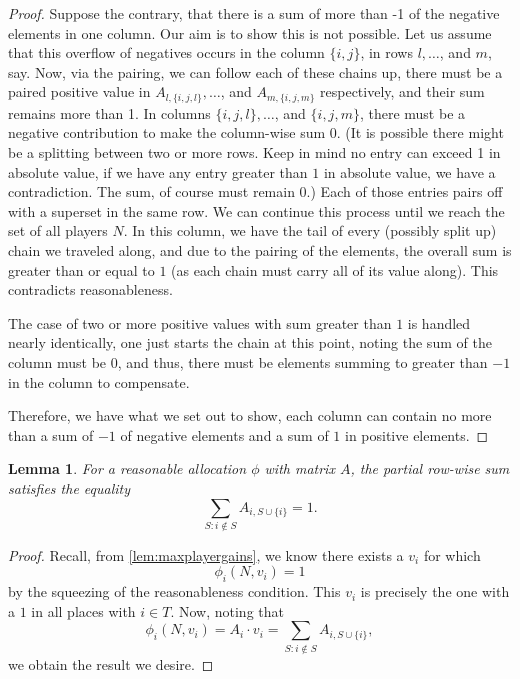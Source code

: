 \documentclass[12pt,letterpaper,final]{article}
\theoremstyle{plain}
\theoremstyle{plain}
\theoremstyle{plain}
\newtheorem{lemma}[theorem]{Lemma}
\theoremstyle{plain}
\theoremstyle{plain}
\theoremstyle{plain}
\theoremstyle{plain}
\theoremstyle{definition}
\theoremstyle{definition}
\theoremstyle{definition}
\theoremstyle{definition}
\theoremstyle{definition}
\theoremstyle{remark}
\theoremstyle{remark}
\theoremstyle{remark}
\theoremstyle{remark}
\begin{document}
\begin{proof}
  Suppose the contrary, that there is a sum of more than -1 of the
  negative elements in one column. Our aim is to show this is not
  possible. Let us assume that this overflow of negatives occurs in
  the column \(\{i,j\}\), in rows \(l, \ldots\), and \(m\), say.
  Now, via the
  pairing, we can follow each of these chains up, there must be a
  paired positive value in \(A_{l,\{i,j,l\}}, \ldots\), and \(A_{m,\{i,j,m\}}\)
  respectively, and their sum remains more than 1. In columns
  \(\{i,j,l\}, \ldots\), and \(\{i,j,m\}\), there must be a negative
  contribution to make the column-wise sum 0. (It is possible there
  might be a splitting between two or more rows. Keep in mind no entry
  can exceed 1 in absolute value, if we have any entry greater than
  \(1\) in absolute value, we have a contradiction. The sum, of course
  must remain 0.)
  Each of those entries pairs off with a superset in
  the same row. We can continue this process until we reach the set of
  all players \(N\). In this column, we have the tail of every
  (possibly split up) chain we traveled along, and due to the pairing
  of the elements, the overall sum is greater than or equal to \(1\)
  (as each chain must carry all of its value along). This contradicts
  reasonableness.

  The case of two or more positive values with sum greater than \(1\)
  is handled nearly identically, one just starts the chain at this
  point, noting the sum of the column must be 0, and thus, there must
  be elements summing to greater than \(-1\) in the column to
  compensate.

  Therefore, we have what we set out to show, each column can contain
  no more than a sum of \(-1\) of negative elements and a sum of \(1\)
  in positive elements.
\end{proof}

\begin{lemma}\label{thm:partialRowSum1}
  For a reasonable allocation \(\phi\) with matrix  \(A\), the
  partial row-wise sum satisfies the equality
  \[
    \sum_{S: i\notin S} A_{i,S \cup \{i\}} = 1.
  \]
\end{lemma}

\begin{proof}
  Recall, from \cref{lem:maxplayergains}, we know there exists a
  \(v_i\) for which 
  \[
    \phi_i(N,v_i) = 1
  \]
  by the squeezing of the reasonableness condition.
  This \(v_i\) is precisely the one with a \(1\) in all places with
  \(i\in T\). 
  Now, noting that
  \[
    \phi_i(N,v_i) = A_i\cdot v_i = \sum_{S: i\notin S} A_{i,S \cup \{i\}},
  \]
  we obtain the result we desire.
\end{proof}
\end{document}
